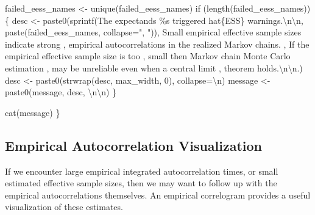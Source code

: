 \documentclass[
  letterpaper,
  DIV=11,
  numbers=noendperiod]{scrartcl}
\newenvironment{Shaded}{\begin{snugshade}}{\end{snugshade}}
\newcommand{\AttributeTok}[1]{\textcolor[rgb]{0.40,0.45,0.13}{#1}}
\newcommand{\ControlFlowTok}[1]{\textcolor[rgb]{0.00,0.23,0.31}{#1}}
\newcommand{\DecValTok}[1]{\textcolor[rgb]{0.68,0.00,0.00}{#1}}
\newcommand{\FunctionTok}[1]{\textcolor[rgb]{0.28,0.35,0.67}{#1}}
\newcommand{\NormalTok}[1]{\textcolor[rgb]{0.00,0.23,0.31}{#1}}
\newcommand{\OtherTok}[1]{\textcolor[rgb]{0.00,0.23,0.31}{#1}}
\newcommand{\SpecialCharTok}[1]{\textcolor[rgb]{0.37,0.37,0.37}{#1}}
\newcommand{\StringTok}[1]{\textcolor[rgb]{0.13,0.47,0.30}{#1}}
\begin{document}
\begin{Shaded}
\begin{Highlighting}[]
\NormalTok{  failed\_eess\_names }\OtherTok{\textless{}{-}} \FunctionTok{unique}\NormalTok{(failed\_eess\_names)}
  \ControlFlowTok{if}\NormalTok{ (}\FunctionTok{length}\NormalTok{(failed\_eess\_names)) \{}
\NormalTok{    desc }\OtherTok{\textless{}{-}} 
      \FunctionTok{paste0}\NormalTok{(}\FunctionTok{sprintf}\NormalTok{(}\StringTok{\textquotesingle{}The expectands \%s triggered hat\{ESS\} warnings.}\SpecialCharTok{\textbackslash{}n\textbackslash{}n}\StringTok{\textquotesingle{}}\NormalTok{,}
             \FunctionTok{paste}\NormalTok{(failed\_eess\_names, }\AttributeTok{collapse=}\StringTok{", "}\NormalTok{)),}
             \StringTok{\textquotesingle{}  Small empirical effective sample sizes indicate strong \textquotesingle{}}\NormalTok{,}
             \StringTok{\textquotesingle{}empirical autocorrelations in the realized Markov chains. \textquotesingle{}}\NormalTok{,}
             \StringTok{\textquotesingle{}If the empirical effective sample size is too \textquotesingle{}}\NormalTok{,}
             \StringTok{\textquotesingle{}small then Markov chain Monte Carlo estimation \textquotesingle{}}\NormalTok{,}
             \StringTok{\textquotesingle{}may be unreliable even when a central limit \textquotesingle{}}\NormalTok{,}
             \StringTok{\textquotesingle{}theorem holds.}\SpecialCharTok{\textbackslash{}n\textbackslash{}n}\StringTok{.\textquotesingle{}}\NormalTok{)}
\NormalTok{    desc }\OtherTok{\textless{}{-}} \FunctionTok{paste0}\NormalTok{(}\FunctionTok{strwrap}\NormalTok{(desc, max\_width, }\DecValTok{0}\NormalTok{), }\AttributeTok{collapse=}\StringTok{\textquotesingle{}}\SpecialCharTok{\textbackslash{}n}\StringTok{\textquotesingle{}}\NormalTok{)}
\NormalTok{    message }\OtherTok{\textless{}{-}} \FunctionTok{paste0}\NormalTok{(message, desc, }\StringTok{\textquotesingle{}}\SpecialCharTok{\textbackslash{}n\textbackslash{}n}\StringTok{\textquotesingle{}}\NormalTok{)}
\NormalTok{  \}}
  
  \FunctionTok{cat}\NormalTok{(message)}
\NormalTok{\}}
\end{Highlighting}
\end{Shaded}

\hypertarget{empirical-autocorrelation-visualization}{%
\subsection{Empirical Autocorrelation
Visualization}\label{empirical-autocorrelation-visualization}}

If we encounter large empirical integrated autocorrelation times, or
small estimated effective sample sizes, then we may want to follow up
with the empirical autocorrelations themselves. An empirical correlogram
provides a useful visualization of these estimates.
\end{document}
